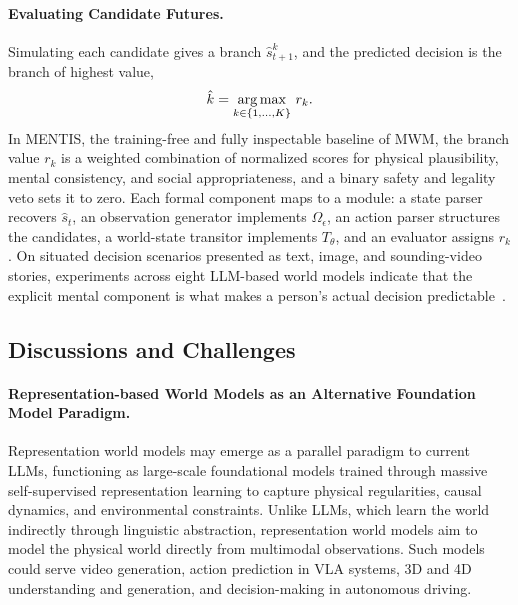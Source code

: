 \paragraph{Evaluating Candidate Futures.}
Simulating each candidate gives a branch $\hat{s}^{k}_{t+1}$, and the predicted decision is the branch of highest value,
\begin{equation}
\label{eq:p3_s8_6_mwm_select}
\hat{k} = \operatorname*{arg\,max}_{k\in\{1,\dots,K\}}\, r_k .
\end{equation}
In MENTIS, the training-free and fully inspectable baseline of MWM, the branch value $r_k$ is a weighted combination of normalized scores for physical plausibility, mental consistency, and social appropriateness, and a binary safety and legality veto sets it to zero. Each formal component maps to a module: a state parser recovers $\hat{s}_t$, an observation generator implements $\Omega_{\epsilon}$, an action parser structures the candidates, a world-state transitor implements $T_{\theta}$, and an evaluator assigns $r_k$. On situated decision scenarios presented as text, image, and sounding-video stories, experiments across eight LLM-based world models indicate that the explicit mental component is what makes a person's actual decision predictable~\cite{fei2026mental}.


\subsection{Discussions and Challenges}
\label{subsec:p3_s8_6_discussion}

\paragraph{Representation-based World Models as an Alternative Foundation Model Paradigm.}
Representation world models may emerge as a parallel paradigm to current LLMs, functioning as large-scale foundational models trained through massive self-supervised representation learning to capture physical regularities, causal dynamics, and environmental constraints.
Unlike LLMs, which learn the world indirectly through linguistic abstraction, representation world models aim to model the physical world directly from multimodal observations.
Such models could serve video generation, action prediction in VLA systems, 3D and 4D understanding and generation, and decision-making in autonomous driving.



